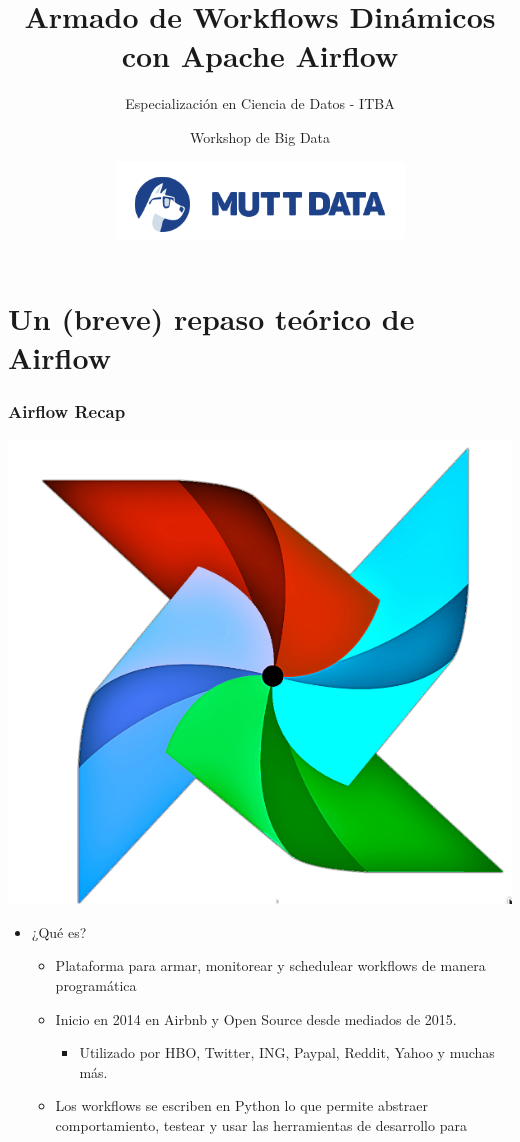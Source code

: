 \documentclass[leqno, 10pt, envcountsect]{beamer}
\title[Intro Airflow]{Armado de Workflows Dinámicos con Apache Airflow}
\subtitle{Especialización en Ciencia de Datos - ITBA}
\author[]{Workshop de Big Data}
\institute[]{13 de Agosto de 2021}
\date[]{\includegraphics[scale=0.35]{logo_mutt.png}}
\numberwithin{equation}{section}
\theoremstyle{definition}
\theoremstyle{example}
\numberwithin{figure}{section}
\numberwithin{table}{section}
\let\olditem\item
\renewcommand{\item}{%
\olditem\vspace{1pt}}
\begin{document}
\frame[plain]{\titlepage}

\section{Un (breve) repaso teórico de Airflow}
\label{sec:un_breve_repaso_teorico_de_airflow}

\begin{frame}[fragile=singleslide]
  \frametitle{Airflow Recap}
  \begin{center}
    \includegraphics[scale=0.09]{airflow.png}
  \end{center}
  \begin{itemize}
    \item ¿Qué es?
    \begin{itemize}
      \item Plataforma para armar, monitorear y schedulear workflows de manera programática
      \item Inicio en 2014 en Airbnb y Open Source desde mediados de 2015.
        \begin{itemize}
          \item Utilizado por HBO, Twitter, ING, Paypal, Reddit, Yahoo y muchas más.
        \end{itemize}
      \item Los workflows se escriben en Python lo que permite abstraer
        comportamiento, testear y usar las herramientas de desarrollo para

\end{itemize}
\end{itemize}
\end{frame}
\end{document}
